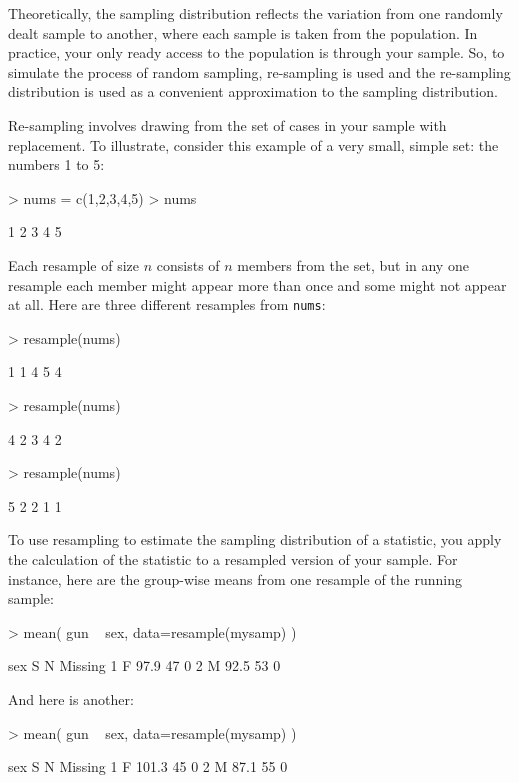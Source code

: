 Theoretically, the sampling distribution reflects the variation from
one randomly dealt sample to another, where each sample is taken from
the population.  In practice, your only ready access to the population
is through your sample.  So, to simulate the process of random
sampling, re-sampling is used and the re-sampling distribution is used
as a convenient approximation to the sampling distribution.

Re-sampling involves drawing from the set of cases in your sample with replacement.  To
illustrate, consider this example of a 
very small, simple set: 
the numbers 1 to 5:
\begin{Schunk}
\begin{Sinput}
> nums = c(1,2,3,4,5)
> nums
\end{Sinput}
\begin{Soutput}
[1] 1 2 3 4 5
\end{Soutput}
\end{Schunk}

Each resample of size $n$ consists of $n$ members from the set, but in
any one resample
each member might appear more than once and some might not appear at
all.  Here are three different resamples from \texttt{nums}:
\begin{Schunk}
\begin{Sinput}
> resample(nums)
\end{Sinput}
\begin{Soutput}
[1] 1 1 4 5 4
\end{Soutput}
\begin{Sinput}
> resample(nums)
\end{Sinput}
\begin{Soutput}
[1] 4 2 3 4 2
\end{Soutput}
\begin{Sinput}
> resample(nums)
\end{Sinput}
\begin{Soutput}
[1] 5 2 2 1 1
\end{Soutput}
\end{Schunk}

To use resampling to estimate the sampling distribution of a
statistic, you apply the calculation of the statistic to a resampled
version of your sample.  For instance, here are the group-wise means
from one resample of the running sample:
\begin{Schunk}
\begin{Sinput}
> mean( gun ~ sex, data=resample(mysamp) )
\end{Sinput}
\begin{Soutput}
  sex    S  N Missing
1   F 97.9 47       0
2   M 92.5 53       0
\end{Soutput}
\end{Schunk}
And here is another:
\begin{Schunk}
\begin{Sinput}
> mean( gun ~ sex, data=resample(mysamp) )
\end{Sinput}
\begin{Soutput}
  sex     S  N Missing
1   F 101.3 45       0
2   M  87.1 55       0
\end{Soutput}
\end{Schunk}

